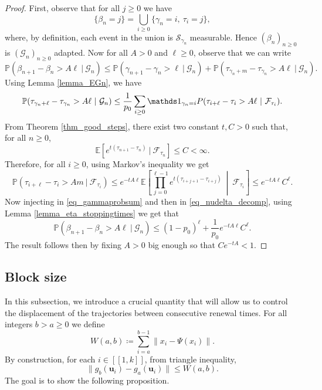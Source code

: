 \documentclass[a4paper, 11pt]{article}
\theoremstyle{plain}
\theoremstyle{definition}
\newcommand{\E}{\mathbb{E}}
\renewcommand{\P}{\mathbb{P}}
\newcommand{\range}[2]{[\![#1,#2]\!]}
\numberwithin{equation}{section}
\begin{document}
\begin{proof}
    First, observe that for all $j\geq 0$ we have
        \[\{\beta_n=j\}=\bigcup_{i\geq 0}\{\gamma_n=i,~\tau_i=j\},\]
    where, by definition, each event in the union is $\mathcal S_{\gamma_n}$ measurable. Hence $(\beta_n)_{n\geq 0}$ is $(\mathcal G_n)_{n\geq 0}$ adapted. Now for all $A>0$ and $\ell\geq 0$, observe that we can write
        \begin{equation}
            \label{eq_nudelta_decomp}
            \P(\beta_{n+1}-\beta_n>A\ell~|~\mathcal G_n)\leq\P(\gamma_{n+1}-\gamma_n>\ell~|~\mathcal G_n)+\P(\tau_{\gamma_n+m}-\tau_{\gamma_n}>A\ell~|~\mathcal G_n).
        \end{equation}
    Using Lemma \ref{lemma_EGn}, we have
        \begin{equation}
            \label{eq_gammaprobsum}
            \P(\tau_{\gamma_n+\ell}-\tau_{\gamma_n}>A\ell~|~\mathcal G_n)\leq\frac{1}{p_0}\sum_{i\geq 0}\mathds 1_{\gamma_n=i}\\P(\tau_{i+\ell}-\tau_i>A\ell~|~\mathcal F_{\tau_i}).
        \end{equation}
    From Theorem \ref{thm_good_steps}, there exist two constant $t, C>0$ such that, for all $n\geq 0$,
        \[\E[e^{t(\tau_{n+1}-\tau_n)}~|~\mathcal F_{\tau_n}]\leq C<\infty.\]
    Therefore, for all $i\geq 0$, using Markov's inequality we get
        \begin{equation*}
            \P(\tau_{i+\ell}-\tau_i>Am~|~\mathcal F_{\tau_i})
            \leq e^{-tA\ell}\E\left[\prod_{j=0}^{\ell-1}e^{t(\tau_{i+j+1}-\tau_{i+j})}~\middle|~\mathcal F_{\tau_i}\right]
            \leq e^{-tA\ell}C^\ell.
        \end{equation*}
    Now injecting in \eqref{eq_gammaprobsum} and then in \eqref{eq_nudelta_decomp}, using Lemma \ref{lemma_eta_stoppingtimes} we get that
        \[\P(\beta_{n+1}-\beta_n>A\ell~|~\mathcal G_n)\leq(1-p_0)^\ell+\frac{1}{p_0}e^{-tA\ell}C^\ell.\]
    The result follows then by fixing $A>0$ big enough so that $Ce^{-tA}<1$.
\end{proof}


\subsection{Block size}

\label{subsection_block_size}

In this subsection, we introduce a crucial quantity that will allow us to control the displacement of the trajectories between consecutive renewal times. For all integers $b>a\geq 0$ we define
    \[W(a,b)\coloneqq\sum_{i=a}^{b-1}\|x_i-\Psi(x_i)\|.\]
By construction, for each $i\in\range{1}{k}$, from triangle inequality,
    \[\|g_b(\mathbf u_i)-g_a(\mathbf u_i)\|\leq W(a, b).\]
The goal is to show the following proposition.
\end{document}

